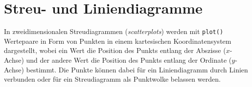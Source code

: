 %
%

\section{Streu- und Liniendiagramme}
\label{sec:plot}

In zweidimensionalen Streudiagrammen (\emph{scatterplots}) werden mit \lstinline!plot()! Wertepaare in Form von Punkten in einem kartesischen Koordinatensystem dargestellt, wobei ein Wert die Position des Punkts entlang der Abszisse ($x$-Achse) und der andere Wert die Position des Punkts entlang der Ordinate ($y$-Achse) bestimmt. Die Punkte können dabei für ein Liniendiagramm durch Linien verbunden oder für ein Streudiagramm als Punktwolke belassen werden.


